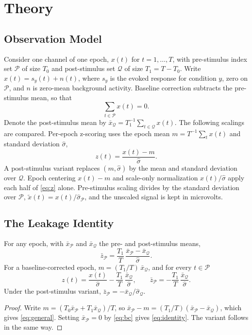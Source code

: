 \section{Theory}\label{sec:theory}

\subsection{Observation Model}
Consider one channel of one epoch, $x(t)$ for $t=1,\dots,T$, with pre-stimulus index set $\mathcal{P}$ of size $T_0$ and post-stimulus set $\mathcal{Q}$ of size $T_1=T-T_0$. Write $x(t)=s_y(t)+n(t)$, where $s_y$ is the evoked response for condition $y$, zero on $\mathcal{P}$, and $n$ is zero-mean background activity. Baseline correction subtracts the pre-stimulus mean, so that
\begin{equation}
\textstyle\sum_{t\in\mathcal{P}} x(t)=0. \label{eq:bc}
\end{equation}
Denote the post-stimulus mean by $\bar{x}_\mathcal{Q}=T_1^{-1}\sum_{t\in\mathcal{Q}}x(t)$. The following scalings are compared. Per-epoch z-scoring uses the epoch mean $m=T^{-1}\sum_t x(t)$ and standard deviation $\hat\sigma$,
\begin{equation}
z(t)=\frac{x(t)-m}{\hat\sigma}. \label{eq:z}
\end{equation}
A post-stimulus variant replaces $(m,\hat\sigma)$ by the mean and standard deviation over $\mathcal{Q}$. Epoch centering $x(t)-m$ and scale-only normalization $x(t)/\hat\sigma$ apply each half of \eqref{eq:z} alone. Pre-stimulus scaling divides by the standard deviation over $\mathcal{P}$, $\tilde{x}(t)=x(t)/\hat\sigma_\mathcal{P}$, and the unscaled signal is kept in microvolts.

\subsection{The Leakage Identity}
\begin{proposition}\label{prop:identity}
For any epoch, with $\bar{x}_\mathcal{P}$ and $\bar{x}_\mathcal{Q}$ the pre- and post-stimulus means,
\begin{equation}
\bar{z}_\mathcal{P}=\frac{T_1}{T}\,\frac{\bar{x}_\mathcal{P}-\bar{x}_\mathcal{Q}}{\hat\sigma}. \label{eq:general}
\end{equation}
For a baseline-corrected epoch, $m=(T_1/T)\,\bar{x}_\mathcal{Q}$, and for every $t\in\mathcal{P}$
\begin{equation}
z(t)=\frac{x(t)}{\hat\sigma}-\frac{T_1}{T}\,\frac{\bar{x}_\mathcal{Q}}{\hat\sigma},
\qquad
\bar{z}_\mathcal{P}=-\frac{T_1}{T}\,\frac{\bar{x}_\mathcal{Q}}{\hat\sigma}. \label{eq:identity}
\end{equation}
Under the post-stimulus variant, $\bar{z}_\mathcal{P}=-\bar{x}_\mathcal{Q}/\hat\sigma_\mathcal{Q}$.
\end{proposition}
\begin{proof}
Write $m=(T_0\bar{x}_\mathcal{P}+T_1\bar{x}_\mathcal{Q})/T$, so $\bar{x}_\mathcal{P}-m=(T_1/T)(\bar{x}_\mathcal{P}-\bar{x}_\mathcal{Q})$, which gives \eqref{eq:general}. Setting $\bar{x}_\mathcal{P}=0$ by \eqref{eq:bc} gives \eqref{eq:identity}. The variant follows in the same way.
\end{proof}

